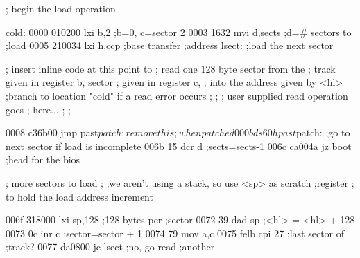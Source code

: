                                   ;         begin the load operation

                                  cold:
0000 010200                                 lxi  b,2               ;b=0, c=sector 2
0003 1632                                   mvi  d,sects           ;d=# sectors to
                                                                   ;load
0005 210034                                 lxi  h,ccp             ;base transfer
                                                                   ;address
                                  lsect:    ;load the next sector

                                  ;         insert inline code at this point to
                                  ;         read one 128 byte sector from the
                                  ;         track given in register b, sector
                                  ;         given in register c,
                                  ;         into the address given by <hl>
                                  ;branch to location "cold" if a read error occurs
                                  ;
                                  ;
                                  ;              user supplied read operation goes
                                  ;              here...
                                  ;
                                  ;

0008 c36b00                                 jmp past$patch         ;remove this
                                                                   ;when patched
000b                                        ds   60h

                                  past$patch:
                                  ;go to next sector if load is incomplete
006b 15                                     dcr  d                 ;sects=sects-1
006c ca004a                                 jz   boot              ;head for the bios

                                  ;         more sectors to load
                                  ;
                                  ;we aren't using a stack, so use <sp> as scratch
                                  ;register
                                  ;         to hold the load address increment

006f 318000                                 lxi  sp,128            ;128 bytes per
                                                                   ;sector
0072 39                                     dad  sp                ;<hl> = <hl> +
                                                                   128
0073 0c                                     inr  c                 ;sector=sector + 1
0074 79                                     mov  a,c
0075 felb                                   cpi  27                ;last sector of
                                                                   ;track?
0077 da0800                                 jc   lsect             ;no, go read
                                                                   ;another

